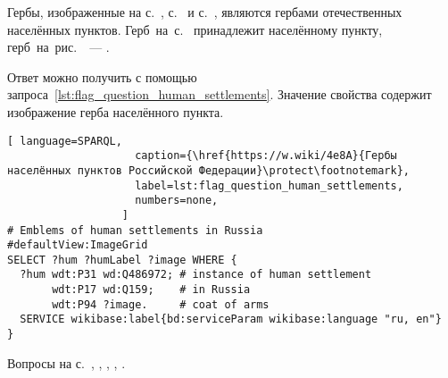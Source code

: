 \begin{task}
\label{answer:flag_human_settlements}
Гербы, изображенные на с.~\pageref{fig:flag_question_human_settlements1}, 
    с.~\pageref{fig:flag_question_human_settlements2} и 
    с.~\pageref{fig:flag_question_human_settlements5}, 
    являются гербами отечественных населённых пунктов. 
    Герб~на~с.~\pageref{fig:flag_question_human_settlements3} 
    принадлежит  населённому пункту, 
    герб~на~рис.~\pageref{fig:flag_question_human_settlements4}~--- 
    . 

Ответ можно получить с помощью запроса~\ref{lst:flag_question_human_settlements}. 
    Значение свойства  
    содержит изображение герба населённого пункта.
   
\begin{lstlisting}[ language=SPARQL, 
                    caption={\href{https://w.wiki/4e8A}{Гербы населённых пунктов Российской Федерации}\protect\footnotemark},
                    label=lst:flag_question_human_settlements,
                    numbers=none,
                  ]
# Emblems of human settlements in Russia
#defaultView:ImageGrid
SELECT ?hum ?humLabel ?image WHERE {
  ?hum wdt:P31 wd:Q486972; # instance of human settlement
       wdt:P17 wd:Q159;    # in Russia
       wdt:P94 ?image.     # coat of arms
  SERVICE wikibase:label{bd:serviceParam wikibase:language "ru, en"}
}
\end{lstlisting}

\small{Вопросы на с.~\pageref{fig:flag_question_human_settlements1}, \pageref{fig:flag_question_human_settlements2}, \pageref{fig:flag_question_human_settlements3}, \pageref{fig:flag_question_human_settlements4}, \pageref{fig:flag_question_human_settlements5}.}
\end{task}




\hfil{}\hfil%
\newpage

